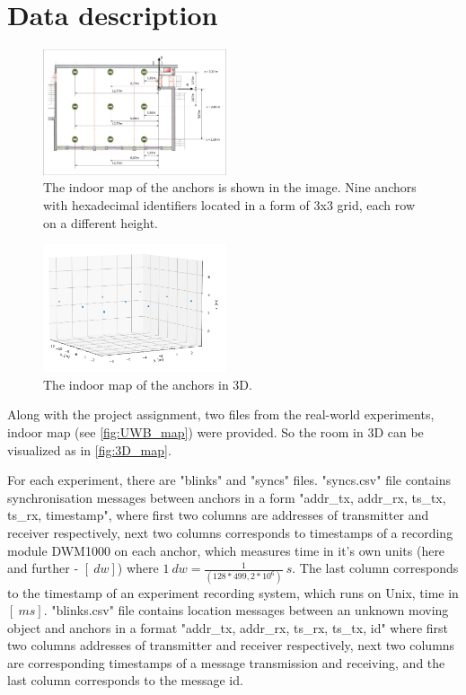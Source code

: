 \documentclass[10pt,journal,compsoc]{IEEEtran}
\begin{document}
\section{Data description}
\label{sec:data_desc}
\begin{figure}[ht]
    \centering
    \includegraphics[width=0.48\textwidth]{graphics/UWB_map.pdf}
    \caption{The indoor map of the anchors is shown in the image. Nine anchors with hexadecimal identifiers located in a form of 3x3 grid, each row on a different height.}
    \label{fig:UWB_map}
\end{figure}
\begin{figure}[ht]
    \centering
    \includegraphics[width=0.48\textwidth]{graphics/room3D.png}
    \caption{The indoor map of the anchors in 3D.}
    \label{fig:3D_map}
\end{figure}

Along with the project assignment, two files from the real-world experiments, indoor map (see \autoref{fig:UWB_map}) were provided. So the room in 3D can be visualized as in \autoref{fig:3D_map}.

For each experiment, there are "blinks" and "syncs" files.
"syncs.csv" file contains synchronisation messages between anchors in a form "addr\_tx, addr\_rx, ts\_tx, ts\_rx, timestamp",  where first two columns are addresses of transmitter and receiver respectively, next two columns corresponds to timestamps of a recording module DWM1000 on each anchor, which measures time in it's own units (here and further - $[\SI{}{dw}]$) where $\SI{1}{dw} = \frac{1}{(128*499,2*10^6)}\SI{}{s}$. 
The last column corresponds to the timestamp of an experiment recording system, which runs on Unix, time in $[\SI{}{ms}]$.
"blinks.csv" file contains location messages between an unknown moving object and anchors in a format "addr\_tx, addr\_rx, ts\_rx, ts\_tx, id" where first two columns addresses of transmitter and receiver respectively, next two columns are corresponding timestamps of a message transmission and receiving, and the last column corresponds to the message id.
\end{document}
